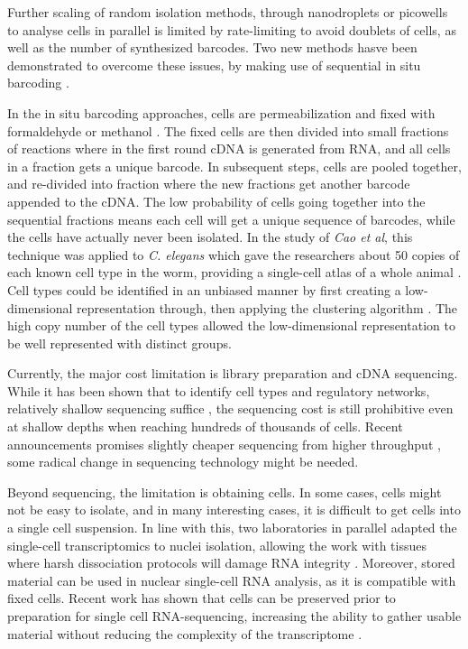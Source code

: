 Further scaling of random isolation methods, through nanodroplets or picowells to analyse cells in parallel is limited by rate-limiting to avoid doublets of cells, as well as the number of synthesized barcodes. Two new methods hasve been demonstrated to overcome these issues, by making use of sequential in situ barcoding \cite{Rosenberg2017-jt, Cao2017-ux}.

In the in situ barcoding approaches, cells are permeabilization and fixed with formaldehyde \cite{Rosenberg2017-jt} or methanol \cite{Cao2017-ux}. The fixed cells are then divided into small fractions of reactions where in the first round cDNA is generated from RNA, and all cells in a fraction gets a unique barcode. In subsequent steps, cells are pooled together, and re-divided into fraction where the new fractions get another barcode appended to the cDNA. The low probability of cells going together into the sequential fractions means each cell will get a unique sequence of barcodes, while the cells have actually never been isolated. In the study of \textit{Cao et al}, this technique was applied to \textit{C. elegans} which gave the researchers about 50 copies of each known cell type in the worm, providing a single-cell atlas of a whole animal \cite{Cao2017-ux}. Cell types could be identified in an unbiased manner by first creating a low-dimensional representation through, then applying the  clustering algorithm \cite{Rodriguez2014-mc}. The high copy number of the cell types allowed the low-dimensional representation to be well represented with distinct groups.

Currently, the major cost limitation is library preparation and cDNA sequencing. While it has been shown that to identify cell types and regulatory networks, relatively shallow sequencing suffice \cite{Heimberg2016-qw, Pollen2014-cs}, the sequencing cost is still prohibitive even at shallow depths when reaching hundreds of thousands of cells. Recent announcements promises slightly cheaper sequencing from higher throughput \cite{Illumina_Inc2017-zg}, some radical change in sequencing technology might be needed.

Beyond sequencing, the limitation is obtaining cells. In some cases, cells might not be easy to isolate, and in many interesting cases, it is difficult to get cells into a single cell suspension. In line with this, two laboratories in parallel adapted the single-cell transcriptomics to nuclei isolation, allowing the work with tissues where harsh dissociation protocols will damage RNA integrity \cite{Habib2016-jm, Habib2017-jk, Lake2016-zb}. Moreover, stored material can be used in nuclear single-cell RNA analysis, as it is compatible with fixed cells. Recent work has shown that cells can be preserved prior to preparation for single cell RNA-sequencing, increasing the ability to gather usable material without reducing the complexity of the transcriptome \cite{Guillaumet-Adkins2017-po, Alles2017-vi}.

